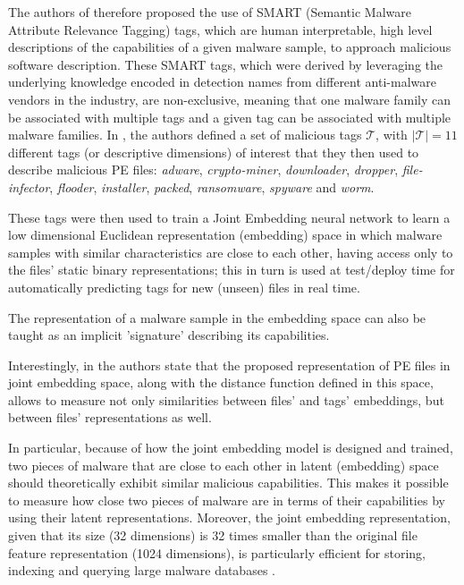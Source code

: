\documentclass[pdfa%
,cucitura%
]{toptesi}
\begin{document}
The authors of \cite{DucauAMDATSE} therefore proposed the use of SMART (Semantic Malware Attribute Relevance Tagging) tags, which are human interpretable, high level descriptions of the capabilities of a given malware sample, to approach malicious software description. These SMART tags, which were derived by leveraging the underlying knowledge encoded in detection names from different anti-malware vendors in the industry, are non-exclusive, meaning that one malware family can be associated with multiple tags and a given tag can be associated with multiple malware families. In \cite{DucauAMDATSE}, the authors defined a set of malicious tags $\mathcal{T}$, with $|\mathcal{T}| = 11$ different tags (or descriptive dimensions) of interest that they then used to describe malicious PE files: \textit{adware}, \textit{crypto-miner}, \textit{downloader}, \textit{dropper}, \textit{file-infector}, \textit{flooder}, \textit{installer}, \textit{packed}, \textit{ransomware}, \textit{spyware} and \textit{worm}.

These tags were then used to train a Joint Embedding neural network to learn a low dimensional Euclidean representation (embedding) space in which malware samples with similar characteristics are close to each other, having access only to the files' static binary representations; this in turn is used at test/deploy time for automatically predicting tags for new (unseen) files in real time.

The representation of a malware sample in the embedding space can also be taught as an implicit 'signature' describing its capabilities.

Interestingly, in \cite{DucauAMDATSE} the authors state that the proposed representation of PE files in joint embedding space, along with the distance function defined in this space, allows to measure not only similarities between files' and tags' embeddings, but between files' representations as well.

In particular, because of how the joint embedding model is designed and trained, two pieces of malware that are close to each other in latent (embedding) space should theoretically exhibit similar malicious capabilities. This makes it possible to measure how close two pieces of malware are in terms of their capabilities by using their latent representations. Moreover, the joint embedding representation, given that its size (32 dimensions) is 32 times smaller than the original file feature representation (1024 dimensions), is particularly efficient for storing, indexing and querying large malware databases \cite{DucauAMDATSE}.
\end{document}

